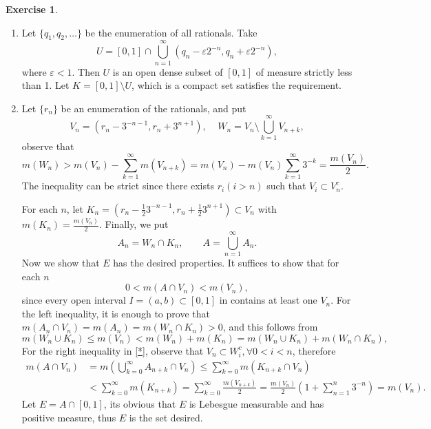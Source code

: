 \documentclass[a4paper]{article}
\newtheorem{ex}{Exercise}[subsection]
\begin{document}
\setcounter{ex}{25}\begin{ex}\end{ex}\begin{enumerate}[label = (\roman*)]
    \item Let $\{q_1, q_2, \dots\}$ be the enumeration of all rationals. Take 
    $$
    U = [0, 1] \cap \bigcup_{n = 1}^\infty (q_n - \varepsilon 2^{-n}, q_n + \varepsilon 2^{-n}),
    $$where $\varepsilon < 1$. Then $U$ is an open dense subset of $[0, 1]$ of measure strictly less than 1. Let
    $K = [0, 1] \setminus U$, which is a compact set satisfies the requirement.
    \item Let $\{r_n\}$ be an enumeration of the rationals, and put$$
    V_n = (r_n - 3^{-n - 1}, r_n + 3^{n + 1}), \ \ \ \ \ W_n = V_n \setminus \bigcup_{k = 1}^\infty V_{n + k},
    $$observe that $$
    m(W_n)>m(V_n)-\sum_{k=1}^{\infty}m(V_{n+k})=m(V_n)-m(V_n)\sum_{k=1}^{\infty}3^{-k}=\frac{m(V_n)}{2}.
    $$The inequality can be strict since there exists $r_i (i > n)$ such that $V_i \subset V_n^c$. 
    
    For each $n$, let $K_n = (r_n - \frac{1}{2}3^{-n - 1}, r_n + \frac{1}{2}3^{n + 1}) \subset V_n$ with 
    $m(K_n) = \frac{m(V_n)}{2}$. Finally, we put $$
    A_n= W_n\cap K_n,\qquad A=\bigcup_{n=1}^{\infty}A_n.
    $$Now we show that $E$ has the desired properties. It suffices to show that for each $n$ \[
    0 < m(A \cap V_n) < m(V_n), \tag{*}\label{*}
    \]since every open interval $I = (a, b) \subset [0, 1]$ in contains at least one $V_n$. 
    For the left inequality, it is enough to prove that $m(A_n\cap V_n)=m(A_n)=m(W_n\cap K_n)>0$, and this follows
    from $$
    m(W_n\cup K_n)\leq m(V_n)<m(W_n)+m(K_n)=m(W_n\cup K_n)+m(W_n\cap K_n),
    $$
    For the right inequality in \eqref{*}, observe that $V_n \subset W_i^c, \forall 0 < i < n$, therefore \begin{align*}
    m(A\cap V_n)&=m\left(\bigcup_{k=0}^{\infty}A_{n+k}\cap V_n\right)\leq\sum_{k=0}^{\infty}m(K_{n+k}\cap V_n)\\
    &<\sum_{k=0}^{\infty}m(K_{n+k})=\sum_{k=0}^{\infty}\frac{m(V_{n+k})}{2}=
    \frac{m(V_n)}{2}(1 + \sum_{n = 1}^n 3^{-n})=m(V_n).
    \end{align*}
    Let $E = A \cap [0, 1]$, its obvious that $E$ is Lebesgue measurable and has positive measure, thus $E$ is the 
    set desired.
\end{enumerate}
\end{document}
